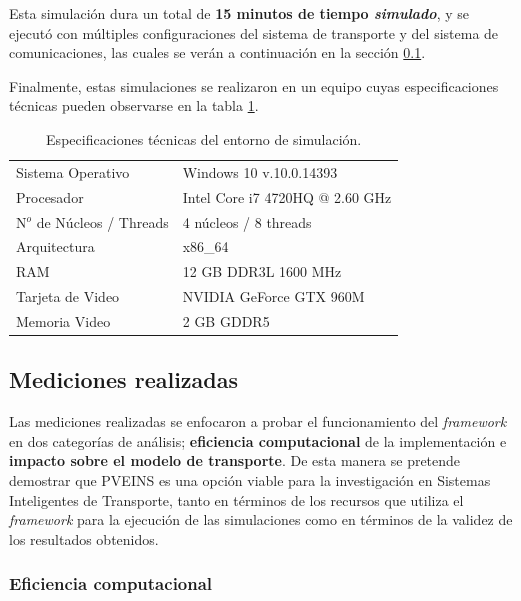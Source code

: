 Esta simulación dura un total de \textbf{15 minutos de tiempo \emph{simulado}}, y se ejecutó con múltiples configuraciones del sistema de transporte y del sistema de comunicaciones, las cuales se verán a continuación en la sección \ref{sec:measurements}.

Finalmente, estas simulaciones se realizaron en un equipo cuyas especificaciones técnicas pueden observarse en la tabla \ref{table:systemspecs}.

\begin{table}[tpb]
    \centering
    \begin{tabular}{@{}ll@{}}
        \toprule
        Sistema Operativo     & Windows 10 v.10.0.14393         \\
        Procesador            & Intel Core i7 4720HQ @ 2.60 GHz \\
        N$^{o}$ de Núcleos / Threads & 4 núcleos / 8 threads\\
        Arquitectura          & x86\_64                         \\
        RAM                   & 12 GB DDR3L 1600 MHz            \\
        Tarjeta de Video      & NVIDIA GeForce GTX 960M         \\
        Memoria Video         & 2 GB GDDR5                      \\ \bottomrule
    \end{tabular}
    \caption{Especificaciones técnicas del entorno de simulación.}
    \label{table:systemspecs}
\end{table}

\subsection{Mediciones realizadas} \label{sec:measurements}

Las mediciones realizadas se enfocaron a probar el funcionamiento del \emph{framework} en dos categorías de análisis; \textbf{eficiencia computacional} de la implementación e \textbf{impacto sobre el modelo de transporte}. De esta manera se pretende demostrar que PVEINS es una opción viable para la investigación en Sistemas Inteligentes de Transporte, tanto en términos de los recursos que utiliza el \emph{framework} para la ejecución de las simulaciones como en términos de la validez de los resultados obtenidos.

\subsubsection{Eficiencia computacional}

